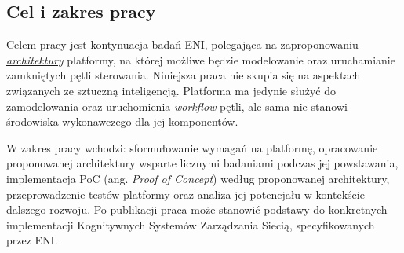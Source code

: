 \subsection{Cel i zakres pracy}

Celem pracy jest kontynuacja badań ENI, polegająca na zaproponowaniu \hyperref[def:architektura]{\textit{architektury}} platformy, na której możliwe będzie modelowanie oraz uruchamianie zamkniętych pętli sterowania. Niniejsza praca nie skupia się na aspektach związanych ze sztuczną inteligencją. Platforma ma jedynie służyć do zamodelowania oraz uruchomienia \hyperref[def:workflow]{\textit{workflow}} pętli, ale sama nie stanowi środowiska wykonawczego dla jej komponentów. 

W zakres pracy wchodzi: sformułowanie wymagań na platformę, opracowanie proponowanej architektury wsparte licznymi badaniami podczas jej powstawania, implementacja PoC (ang. \textit{Proof of Concept}) według proponowanej architektury, przeprowadzenie testów platformy oraz analiza jej potencjału w kontekście dalszego rozwoju. Po publikacji praca może stanowić podstawy do konkretnych implementacji Kognitywnych Systemów Zarządzania Siecią, specyfikowanych przez ENI. 